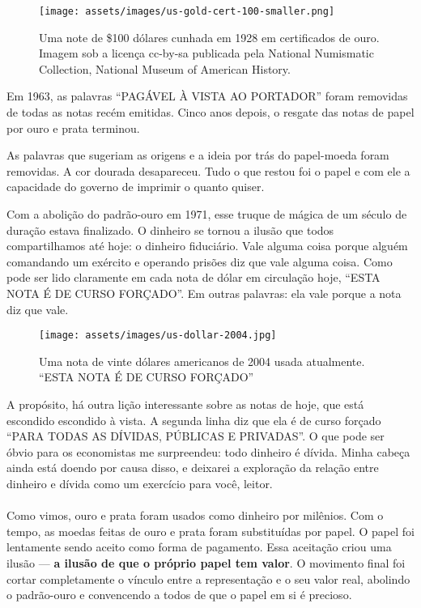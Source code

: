 \begin{figure}
  \centering
  \texttt{[image: assets/images/us-gold-cert-100-smaller.png]}
  \caption{Uma note de \$100 dólares cunhada em 1928 em certificados de ouro. Imagem sob a licença cc-by-sa publicada pela National Numismatic Collection, National Museum of American History.}
  \label{fig:us-gold-cert-100-smaller}
\end{figure}

Em 1963, as palavras \enquote{PAGÁVEL À VISTA AO PORTADOR} foram removidas de todas as notas recém emitidas. Cinco anos depois, o resgate das notas de papel por ouro e prata terminou.

As palavras que sugeriam as origens e a ideia por trás do papel-moeda foram removidas. A cor dourada desapareceu. Tudo o que restou foi o papel e com ele a capacidade do governo de imprimir o quanto quiser.

Com a abolição do padrão-ouro em 1971, esse truque de mágica de um século de duração estava finalizado. O dinheiro se tornou a ilusão que todos compartilhamos até hoje: o dinheiro fiduciário. Vale alguma coisa porque alguém comandando um exército e operando prisões diz que vale alguma coisa. Como pode ser lido claramente em cada nota de dólar em circulação hoje, \enquote{ESTA NOTA É DE CURSO FORÇADO}. Em outras palavras: ela vale porque a nota diz que vale.

\begin{figure}
  \centering
  \texttt{[image: assets/images/us-dollar-2004.jpg]}
  \caption{Uma nota de vinte dólares americanos de 2004 usada atualmente. \enquote{ESTA NOTA É DE CURSO FORÇADO}}
  \label{fig:us-dollar-2004}
\end{figure}

A propósito, há outra lição interessante sobre as notas de hoje, que está escondido escondido à vista. A segunda linha diz que ela é de curso forçado \enquote{PARA TODAS AS DÍVIDAS, PÚBLICAS E PRIVADAS}. O que pode ser óbvio para os economistas me surpreendeu: todo dinheiro é dívida. Minha cabeça ainda está doendo por causa disso, e deixarei a exploração da relação entre dinheiro e dívida como um exercício para você, leitor.

\paragraph{}
Como vimos, ouro e prata foram usados como dinheiro por milênios. Com o tempo, as moedas feitas de ouro e prata foram substituídas por papel. O papel foi lentamente sendo aceito como forma de pagamento. Essa aceitação criou uma ilusão --- \textbf{a ilusão de que o próprio papel tem valor}. O movimento final foi cortar completamente o vínculo entre a representação e o seu valor real, abolindo o padrão-ouro e convencendo a todos de que o papel em si é precioso.

